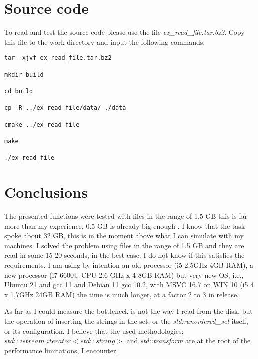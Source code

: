 \documentclass{article}
\begin{document}
\section{Source code}
To read and test the source code please use the file \textit{ex\_read\_file.tar.bz2}.
Copy this file to the work directory and input the following commands.

\begin{lstlisting}
tar -xjvf ex_read_file.tar.bz2

mkdir build

cd build

cp -R ../ex_read_file/data/ ./data

cmake ../ex_read_file

make

./ex_read_file

\end{lstlisting}



\section{Conclusions}

The presented functions were tested with files in the range of 1.5 GB this is far more than my experience, 0.5 GB is already big enough .  I know that the task spoke about 32 GB, this is in the moment above what I can simulate with my machines. I solved the problem using files in the range of 1.5 GB and they are read in some 15-20 seconds, in the best case. I do not know if this satisfies the requirements. I am using by intention an old processor (i5 2,5GHz 4GB RAM), a new processor (i7-6600U CPU 2.6 GHz x 4 8GB RAM) but very new OS, i.e., Ubuntu 21 and gcc 11 and Debian 11 gcc 10.2, with MSVC 16.7 on WIN 10 (i5 4 x 1,7GHz 24GB RAM) the time is much longer, at a factor 2 to 3 in release.

As far as I could measure the bottleneck is not the way I read from the disk, but the operation of inserting the strings in the set, or the \textit{std::unordered\_set} itself, or its configuration. I believe that the used methodologies: $std::istream\_iterator<std::string>$ and \textit{std::transform} are at the root of the performance limitations, I encounter.
 

\newpage

 

\end{document}
